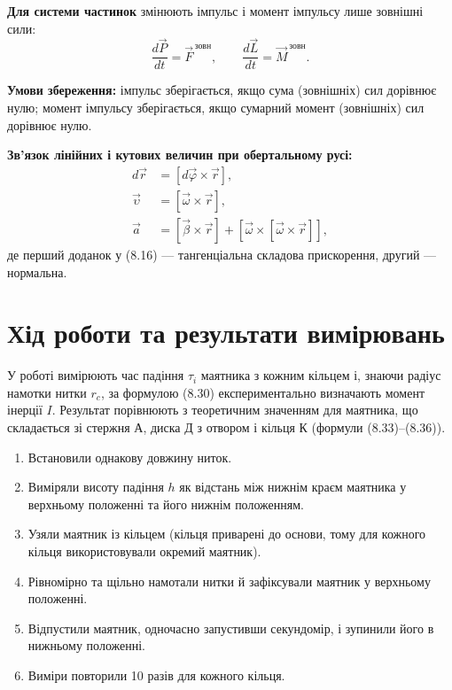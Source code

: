 \documentclass[ukrainian]{ucaphyslab}
\begin{document}
\textbf{Для системи частинок} змінюють імпульс і момент імпульсу лише зовнішні сили:
\begin{equation}
  \frac{d\vec P}{dt} = \vec F^{\,\text{зовн}}, \qquad \frac{d\vec L}{dt} = \vec M^{\,\text{зовн}}. \tag{8.7, 8.12}
\end{equation}

\begin{keyfacts}
\textbf{Умови збереження:} імпульс зберігається, якщо сума (зовнішніх) сил дорівнює нулю; момент імпульсу зберігається, якщо сумарний момент (зовнішніх) сил дорівнює нулю.
\end{keyfacts}

\textbf{Зв'язок лінійних і кутових величин при обертальному русі:}
\begin{align}
  d\vec r &= [d\vec\varphi\times\vec r], \tag{8.14}\\
  \vec\upsilon &= [\vec\omega\times\vec r], \tag{8.15}\\
  \vec a &= [\vec\beta\times\vec r] + [\vec\omega\times[\vec\omega\times\vec r]], \tag{8.16}
\end{align}
де перший доданок у (8.16) — тангенціальна складова прискорення, другий — нормальна.

\section{Хід роботи та результати вимірювань}

У роботі вимірюють час падіння $\tau_i$ маятника з кожним кільцем і, знаючи радіус намотки
нитки $r_c$, за формулою (8.30) експериментально визначають момент інерції $I$.
Результат порівнюють з теоретичним значенням для маятника, що складається зі стержня А,
диска Д з отвором і кільця К (формули (8.33)–(8.36)).

\begin{enumerate}
  \item Встановили однакову довжину ниток.
  \item Виміряли висоту падіння $h$ як відстань між нижнім краєм маятника у верхньому
    положенні та його нижнім положенням.
  \item Узяли маятник із кільцем (кільця приварені до основи, тому для кожного кільця
    використовували окремий маятник).
  \item Рівномірно та щільно намотали нитки й зафіксували маятник у верхньому положенні.
  \item Відпустили маятник, одночасно запустивши секундомір, і зупинили його в нижньому положенні.
  \item Виміри повторили 10 разів для кожного кільця.
\end{enumerate}
\end{document}
